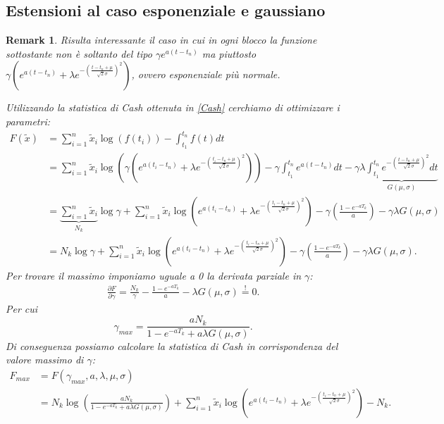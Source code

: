 \documentclass[10pt,a4paper]{report}
\newtheorem{remark}{Remark}
\begin{document}
\subsection{Estensioni al caso esponenziale e gaussiano}
\begin{remark}
Risulta interessante il caso in cui in ogni blocco la funzione sottostante non è soltanto del tipo $\gamma e^{a(t-t_n)}$ ma piuttosto $\gamma\left( e^{a(t-t_n)}+\lambda e^{-\left(\frac{t-t_n+\mu}{\sqrt{2}\sigma}\right)^2}\right)$, ovvero esponenziale più normale.

Utilizzando la statistica di Cash ottenuta in \eqref{Cash} cerchiamo di ottimizzare i parametri:
\begin{align*}
F(\tilde{x}) &= \sum_{i=1}^n\tilde{x}_i\log(f(t_i))-\int_{t_1}^{t_n}f(t) dt \\
&= \sum_{i=1}^{n}\tilde{x}_i\log\left(\gamma\left( e^{a(t_i-t_n)}+\lambda e^{-\left(\frac{t_i-t_n+\mu}{\sqrt{2}\sigma}\right)^2}\right)\right) - \gamma\int_{t_1}^{t_n}e^{a(t-t_n)} dt - \gamma\lambda\underbrace{\int_{t_1}^{t_n}e^{-\left(\frac{t-t_n+\mu}{\sqrt{2}\sigma}\right)^2}dt}_{G(\mu,\sigma)}\\
&= \underbrace{\sum_{i=1}^n\tilde{x}_i}_{N_k}\log\gamma + \sum_{i=1}^n\tilde{x}_i\log\left( e^{a(t_i-t_n)}+\lambda e^{-\left(\frac{t_i-t_n+\mu}{\sqrt{2}\sigma}\right)^2}\right)-\gamma\left(\frac{1-e^{-aT_k}}{a}\right)-\gamma\lambda G(\mu,\sigma)\\
&= N_k\log\gamma + \sum_{i=1}^n\tilde{x}_i\log\left( e^{a(t_i-t_n)}+\lambda e^{-\left(\frac{t_i-t_n+\mu}{\sqrt{2}\sigma}\right)^2}\right)-\gamma\left(\frac{1-e^{-aT_k}}{a}\right)-\gamma\lambda G(\mu,\sigma).
\end{align*}
Per trovare il massimo imponiamo uguale a 0 la derivata parziale in $\gamma$:
\begin{gather*}
\frac{\partial F}{\partial\gamma} = \frac{N_k}{\gamma}-\frac{1-e^{-aT_k}}{a}-\lambda G(\mu,\sigma)\stackrel{!}{=}0.
\end{gather*}
Per cui
$$
\gamma_{max} = \frac{aN_k}{1-e^{-aT_k}+a\lambda G(\mu,\sigma)}.
$$
Di conseguenza possiamo calcolare la statistica di Cash in corrispondenza del valore massimo di $\gamma$:
\begin{align*}
F_{max} &= F(\gamma_{max},a,\lambda,\mu,\sigma) \\
&= N_k\log\left(\frac{aN_k}{1-e^{-aT_k}+a\lambda G(\mu,\sigma)}\right) + \sum_{i=1}^n\tilde{x}_i\log\left( e^{a(t_i-t_n)}+\lambda e^{-\left(\frac{t_i-t_n+\mu}{\sqrt{2}\sigma}\right)^2}\right)-N_k.
\end{align*}

\end{remark}
\end{document}
